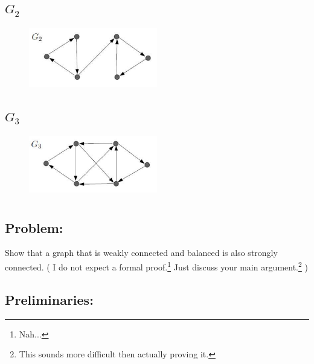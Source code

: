 \documentclass[]{article}
\numberwithin{equation}{section}
\begin{document}
\subsection{$G_2$}
\begin{figure}[h]
    \centering
    \includegraphics[width=0.5\textwidth]{figs/pblm6b.png}
\end{figure}







\subsection{$G_3$}
\begin{figure}[h]
    \centering
    \includegraphics[width=0.5\textwidth]{figs/pblm6c.png}
\end{figure}






\newpage
\section{}
\subsection*{Problem:}
Show that a graph that is weakly connected and balanced is also strongly connected.
(
    I do not expect a formal proof.\footnote{
        Nah...
    }
    Just discuss your main argument.\footnote{
        This sounds more difficult then actually proving it.
    }
)

\subsection*{Preliminaries:}
\end{document}
